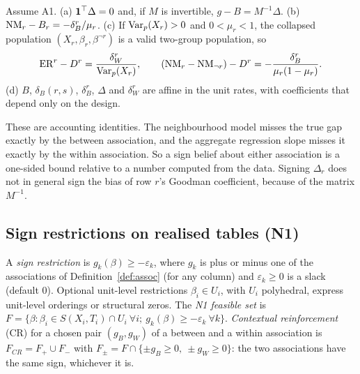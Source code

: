 \begin{lemma}\label{lem:M1}
Assume A1. (a) $\mathbf 1^\top\Delta=0$ and, if $M$ is invertible, $g-B=M^{-1}\Delta$.
(b) $\mathrm{NM}_r-B_r=-\delta^r_B/\mu_r$. (c) If $\operatorname{Var}_p(X_r)>0$ and $0<\mu_r<1$, the
collapsed population $(X_r,\beta_r,\beta^{\neg r})$ is a valid two-group
population, so
\[
\mathrm{ER}^r-D^r=\frac{\delta^r_W}{\operatorname{Var}_p(X_r)},\qquad(\mathrm{NM}_r-\mathrm{NM}_{\neg r})-D^r=-\frac{\delta^r_B}{\mu_r(1-\mu_r)}.
\]
(d) $B$, $\delta_B(r,s)$, $\delta^r_B$, $\Delta$ and $\delta^r_W$ are affine in
the unit rates, with coefficients that depend only on the design.
\end{lemma}
\begin{reading}
These are accounting identities. The neighbourhood model misses the true gap
exactly by the between association, and the aggregate regression slope misses it
exactly by the within association. So a sign belief about either association is
a one-sided bound relative to a number computed from the data. Signing $\Delta_r$
does not in general sign the bias of row $r$'s Goodman coefficient, because of
the matrix $M^{-1}$.
\end{reading}

\subsection{Sign restrictions on realised tables (N1)}

\begin{definition}
A \emph{sign restriction} is $g_k(\beta)\ge-\varepsilon_k$, where $g_k$ is plus or
minus one of the associations of Definition~\ref{def:assoc} (for any column) and
$\varepsilon_k\ge0$ is a slack (default 0). Optional unit-level restrictions
$\beta_i\in U_i$, with $U_i$ polyhedral, express unit-level orderings or
structural zeros. The \emph{N1 feasible set} is
$F=\{\beta:\beta_i\in S(X_i,T_i)\cap U_i\ \forall i;\ g_k(\beta)\ge-\varepsilon_k\ \forall k\}$.
\emph{Contextual reinforcement} (CR) for a chosen pair $(g_B,g_W)$ of a between
and a within association is $F_{CR}=F_+\cup F_-$ with
$F_\pm=F\cap\{\pm g_B\ge0,\ \pm g_W\ge0\}$: the two associations have the same
sign, whichever it is.
\end{definition}

